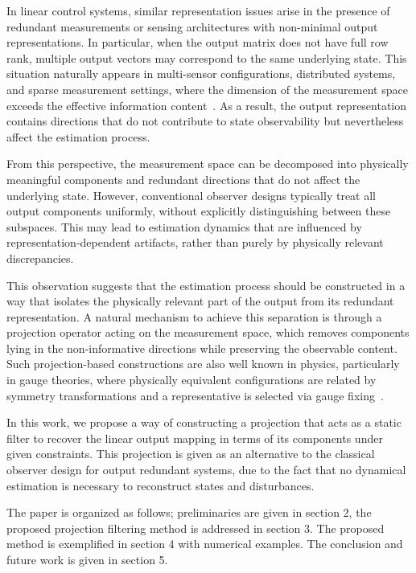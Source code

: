 \documentclass[pdflatex,sn-mathphys-num]{sn-jnl}%
\theoremstyle{thmstyleone}%
\theoremstyle{thmstyletwo}%
\theoremstyle{thmstylethree}%
\begin{document}
In linear control systems, similar representation issues arise in the presence of redundant measurements or sensing architectures with non-minimal output representations. In particular, when the output matrix does not have full row rank, multiple output vectors may correspond to the same underlying state. This situation naturally appears in multi-sensor configurations, distributed systems, and sparse measurement settings, where the dimension of the measurement space exceeds the effective information content~\cite{Chen1999,Kailath1980}. As a result, the output representation contains directions that do not contribute to state observability but nevertheless affect the estimation process.

From this perspective, the measurement space can be decomposed into physically meaningful components and redundant directions that do not affect the underlying state. However, conventional observer designs typically treat all output components uniformly, without explicitly distinguishing between these subspaces. This may lead to estimation dynamics that are influenced by representation-dependent artifacts, rather than purely by physically relevant discrepancies.

This observation suggests that the estimation process should be constructed in a way that isolates the physically relevant part of the output from its redundant representation. A natural mechanism to achieve this separation is through a projection operator acting on the measurement space, which removes components lying in the non-informative directions while preserving the observable content. Such projection-based constructions are also well known in physics, particularly in gauge theories, where physically equivalent configurations are related by symmetry transformations and a representative is selected via gauge fixing~\cite{Peskin1995}.


In this work, we propose a way of constructing a projection that acts as a static filter to recover the linear output mapping in terms of its components under given constraints. This projection is given as an alternative to the classical observer design for output redundant systems, due to the fact that no dynamical estimation is necessary to reconstruct states and disturbances. 

The paper is organized as follows; preliminaries are given in section 2, the proposed projection filtering method is addressed in section 3. The proposed method is exemplified in section 4 with numerical examples. The conclusion and future work is given in section 5.
\end{document}
